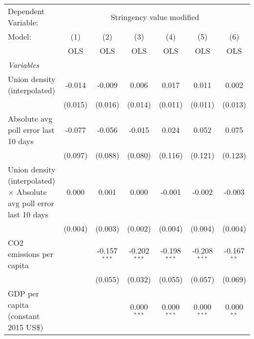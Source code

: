 
\begingroup
\centering
\begin{tabular}{lcccccc}
   \toprule
   Dependent Variable: & \multicolumn{6}{c}{Stringency value modified}\\
   Model:                                                                      & (1)     & (2)            & (3)            & (4)            & (5)            & (6)\\  
                                                                               &  OLS    & OLS            & OLS            & OLS            & OLS            & OLS\\  
   \midrule
   \emph{Variables}\\
   Union density (interpolated)                                                & -0.014  & -0.009         & 0.006          & 0.017          & 0.011          & 0.002\\   
                                                                               & (0.015) & (0.016)        & (0.014)        & (0.011)        & (0.011)        & (0.013)\\   
   Absolute avg poll error last 10 days                                        & -0.077  & -0.056         & -0.015         & 0.024          & 0.052          & 0.075\\   
                                                                               & (0.097) & (0.088)        & (0.080)        & (0.116)        & (0.121)        & (0.123)\\   
   Union density (interpolated) $\times$ Absolute avg poll error last 10 days  & 0.000   & 0.001          & 0.000          & -0.001         & -0.002         & -0.003\\   
                                                                               & (0.004) & (0.003)        & (0.002)        & (0.004)        & (0.004)        & (0.004)\\   
   CO2 emissions per capita                                                    &         & -0.157$^{***}$ & -0.202$^{***}$ & -0.198$^{***}$ & -0.208$^{***}$ & -0.167$^{**}$\\   
                                                                               &         & (0.055)        & (0.032)        & (0.055)        & (0.057)        & (0.069)\\   
   GDP per capita (constant 2015 US\$)                                         &         &                & 0.000$^{***}$  & 0.000$^{***}$  & 0.000$^{***}$  & 0.000$^{**}$\\   

\end{tabular}
